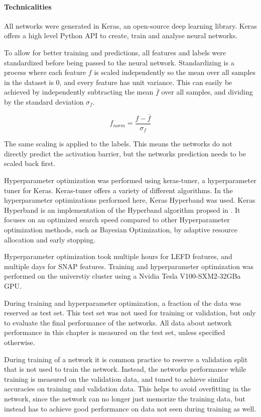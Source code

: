 \paragraph{Technicalities}

All networks were generated in Keras, an open-source deep learning library.
Keras offers a high level Python API to create, train and analyse neural networks.

To allow for better training and predictions, all features and labels were standardized before being passed to the neural network.
Standardizing is a process where each feature $f$ is scaled independently so the mean over all samples in the dataset is 0, 
and every feature has unit variance.
This can easily be achieved by independently subtracting the mean $\overline{f}$ over all samples, and dividing by the standard deviation $\sigma_f$.

$$
f_{norm} = \frac{f- \overline{f}}{\sigma_f}
$$

The same scaling is applied to the labels.
This means the networks do not directly predict the activation barrier, but the networks prediction needs to be scaled back first.

Hyperparameter optimization was performed using keras-tuner, a hyperparameter tuner for Keras.
Keras-tuner offers a variety of different algorithms.
In the hyperparameter optimizations performed here, Keras Hyperband was used.
Keras Hyperband is an  implementation of the Hyperband algorithm propsed in \cite{li2017hyperband}.
It focuses on an optimized search speed compared to other Hyperparameter optimization methods, such as
Bayesian Optimization, by adaptive resource allocation and early stopping.

Hyperparameter optimization took multiple hours for LEFD features, 
and multiple days for SNAP features.
Training and hyperparameter optimization was performed on the universtiy cluster %
using a Nvidia Tesla V100-SXM2-32GBa GPU.

During training and hyperparameter optimization, a fraction of the data was reserved as test set.
This test set was not used for training or validation, but only to evaluate the final performance of the networks.
All data about network performance in this chapter is measured on the test set, unless specified otherwise.

During training of a network it is common practice to reserve a validation split that is not used to train the network.
Instead, the networks performance while training is measured on the validation data, and tuned to achieve similar accuracies on
training and validation data.
This helps to avoid overfitting in the network, since the network can no longer just memorize the training
data, but instead has to achieve good performance on data not seen during training as well.

